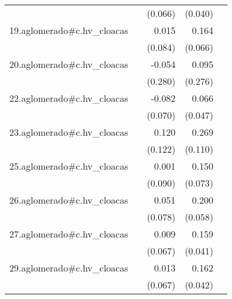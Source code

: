 {\begin{longtable}{l*{4}{D{.}{.}{-1}}}
            &                     &     (0.066)         &     (0.040)         &                     \\
\addlinespace
19.aglomerado#c.hv\_cloacas&                     &       0.015         &       0.164\sym{*}  &                     \\
            &                     &     (0.084)         &     (0.066)         &                     \\
\addlinespace
20.aglomerado#c.hv\_cloacas&                     &      -0.054         &       0.095         &                     \\
            &                     &     (0.280)         &     (0.276)         &                     \\
\addlinespace
22.aglomerado#c.hv\_cloacas&                     &      -0.082         &       0.066         &                     \\
            &                     &     (0.070)         &     (0.047)         &                     \\
\addlinespace
23.aglomerado#c.hv\_cloacas&                     &       0.120         &       0.269\sym{*}  &                     \\
            &                     &     (0.122)         &     (0.110)         &                     \\
\addlinespace
25.aglomerado#c.hv\_cloacas&                     &       0.001         &       0.150\sym{*}  &                     \\
            &                     &     (0.090)         &     (0.073)         &                     \\
\addlinespace
26.aglomerado#c.hv\_cloacas&                     &       0.051         &       0.200\sym{***}&                     \\
            &                     &     (0.078)         &     (0.058)         &                     \\
\addlinespace
27.aglomerado#c.hv\_cloacas&                     &       0.009         &       0.159\sym{***}&                     \\
            &                     &     (0.067)         &     (0.041)         &                     \\
\addlinespace
29.aglomerado#c.hv\_cloacas&                     &       0.013         &       0.162\sym{***}&                     \\
            &                     &     (0.067)         &     (0.042)         &                     \\

\end{longtable}}
